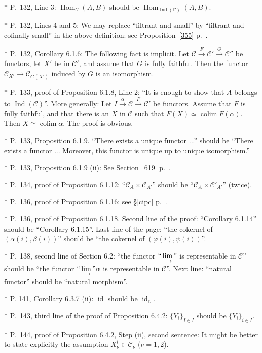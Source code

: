 \documentclass[12pt]{article}
\theoremstyle{remark}
\theoremstyle{definition}
\newcommand{\C}{\mathcal C}
\DeclareMathOperator*{\coli}{colim}
\DeclareMathOperator{\id}{id}
\DeclareMathOperator{\Hom}{Hom}%
\DeclareMathOperator{\Ind}{Ind}
\begin{document}
\noindent $*$ P.~132, Line 3: $\Hom_\C(A,B)$ should be $\Hom_{\Ind(\C)}(A,B)$.

\noindent $*$ P.~132, Lines 4 and 5: \guillemotleft We may replace ``filtrant and small'' by ``filtrant and cofinally small'' in the above definition\guillemotright: see Proposition~\ref{355} p.~\pageref{355}.

\noindent $*$ P.~132, Corollary 6.1.6: The following fact is implicit. Let $\C\xrightarrow{F}\C'\xrightarrow{G}\C''$ be functors, let $X'$ be in $\C'$, and assume that $G$ is fully faithful. Then the functor $\C_{X'}\to\C_{G(X')}$ induced by $G$ is an isomorphism.

\noindent $*$ P.~133, proof of Proposition 6.1.8, Line 2: ``It is enough to show that $A$ belongs to $\Ind(\C)$''. More generally: Let $I\xrightarrow{\alpha}\C\xrightarrow{F}\C'$ be functors. Assume that $F$ is fully faithful, and that there is an $X$ in $\C$ such that $F(X)\simeq\coli F(\alpha)$. Then $X\simeq\coli\alpha$. The proof is obvious.

\noindent $*$ P.~133, Proposition 6.1.9. ``There exists a unique functor ...'' should be ``There exists a functor ... Moreover, this functor is unique up to unique isomorphism.''

\noindent $*$ P.~133, Proposition 6.1.9 (ii): See Section~\ref{619} p.~\pageref{619}.

\noindent $*$ P.~134, proof of Proposition 6.1.12: ``$\C_A\times\C_{A'}$'' should be ``$\C_A\times\C'_{A'}$'' (twice).

\noindent $*$ P.~136, proof of Proposition 6.1.16: see \S\ref{cipc} p.~\pageref{cipc}.

\noindent $*$ P.~136, proof of Proposition 6.1.18. Second line of the proof: ``Corollary 6.1.14'' should be ``Corollary 6.1.15''. Last line of the page: ``the cokernel of $(\alpha(i),\beta(i))$'' should be ``the cokernel of $(\varphi(i),\psi(i))$''.

\noindent $*$ P.~138, second line of Section 6.2: ``the functor $``\displaystyle\lim_{\longrightarrow}"$ is representable in $\C$'' should be ``the functor $``\displaystyle\lim_{\longrightarrow}"\alpha$ is representable in $\C$''. Next line: ``natural functor'' should be ``natural morphism''.

\noindent $*$ P. 141, Corollary 6.3.7 (ii): $\id$ should be $\id_\C$.

\noindent $*$ P.~143, third line of the proof of Proposition 6.4.2: $\{Y_i\}_{I\in I}$ should be $\{Y_i\}_{i\in I}$.

\noindent $*$ P.~144, proof of Proposition 6.4.2, Step (ii), second sentence: It might be better to state explicitly the assumption $X_\nu^i\in\C_\nu$ ($\nu=1,2$). 
\end{document}
